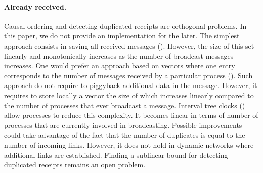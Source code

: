 \paragraph{Already received.} Causal ordering and detecting duplicated receipts
are orthogonal problems. In this paper, we do not provide an implementation for
the later. The simplest approach consists in saving all received messages
(\REF). However, the size of this set linearly and monotonically increases as
the number of broadcast messages increases. One would prefer an approach based
on vectors where one entry corresponds to the number of messages received by a
particular process (\REF). Such approach do not require to piggyback additional
data in the message. However, it requires to store locally a vector the size of
which increases linearly compared to the number of processes that ever broadcast
a message. Interval tree clocks (\REF) allow processes to reduce this
complexity. It becomes linear in terms of number of processes that are currently
involved in broadcasting. Possible improvements could take advantage of the fact
that the number of duplicates is equal to the number of incoming links. However,
it does not hold in dynamic networks where additional links are
established. Finding a sublinear bound for detecting duplicated receipts remains
an open problem.

